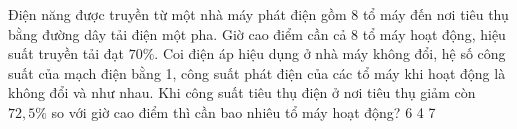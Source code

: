 \begin{vidu}%
	 Điện năng được truyền từ một nhà máy phát điện gồm 8 tổ máy đến nơi tiêu thụ bằng đường dây tải điện một pha. Giờ cao điểm cần cả 8 tổ máy hoạt động, hiệu suất truyền tải đạt $70\%$. Coi điện áp hiệu dụng ở nhà máy không đổi, hệ số công suất của mạch điện bằng 1, công suất phát điện của các tổ máy khi hoạt động là không đổi và như nhau. Khi công suất tiêu thụ điện ở nơi tiêu thụ giảm còn $72,5\%$ so với giờ cao điểm thì cần bao nhiêu tổ máy hoạt động?
	\choice
	{}
	{6}
	{4}
	{7}
\end{vidu}
